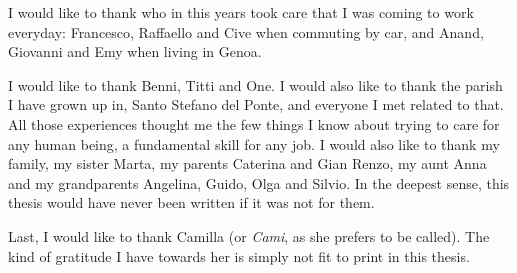 I would like to thank who in this years took care that I was coming to work everyday: Francesco, Raffaello and Cive when commuting by car, and Anand, Giovanni and Emy when living in Genoa. 





I would like to thank Benni, Titti and One. I would also like to thank the parish I have grown up in, Santo Stefano del Ponte, and everyone I met related to that. All those experiences thought me the few things I know about trying to care for any human being, a fundamental skill for any job. I would also like to thank my family, my sister Marta, my parents Caterina and Gian Renzo, my aunt Anna and my grandparents Angelina, Guido, Olga and Silvio. In the deepest sense, this thesis would have never been written if it was not for them.

Last, I would like to thank Camilla (or \emph{Cami}, as she prefers to be called). The kind of gratitude I have towards her is simply not fit to print in this thesis.



